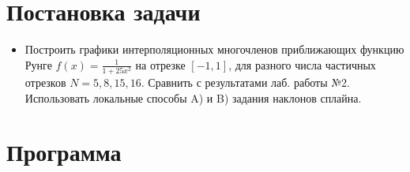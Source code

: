 \documentclass[
11pt,
master, %
subf, %
href, %
colorlinks=true, %
times, %
]{disser}
\begin{document}
\newpage
\section{Постановка задачи}
\begin{itemize}
  \item Построить графики интерполяционных многочленов приближающих функцию Рунге $f(x)=\frac{1}{1+25x^2}$ на отрезке $[-1,1]$, для разного числа частичных отрезков $N=5,8,15,16$. Сравнить с результатами лаб. работы №2.
      Использовать локальные способы A) и B) задания наклонов сплайна.

\end{itemize}

\newpage
\section{Программа}
\end{document}
